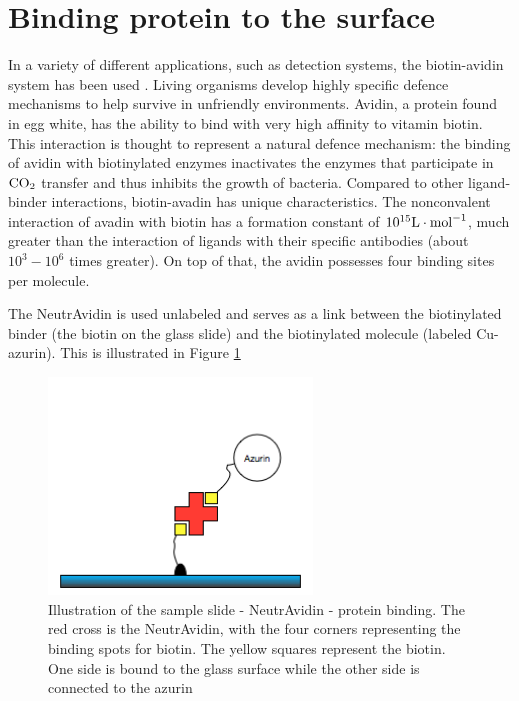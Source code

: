 \documentclass[twoside,single]{lion-msc}
\begin{document}
\section{Binding protein to the surface}\label{neutra}
In a variety of different applications, such as detection systems, the biotin-avidin system has been used \cite{Diamandis1991}. Living organisms develop highly specific defence mechanisms to help survive in unfriendly environments. Avidin, a protein found in egg white, has the ability to bind with very high affinity to vitamin biotin. This interaction is thought to represent a natural defence mechanism: the binding of avidin with biotinylated enzymes inactivates the enzymes that participate in $\textup{CO}_{2}$ transfer and thus inhibits the growth of bacteria. Compared to other  ligand-binder interactions, biotin-avadin has unique characteristics. The nonconvalent interaction of avadin with biotin has a formation constant of $10^{15}\textup{L}\cdot \textup{mol}^{-1}$, much greater than the interaction of ligands with their specific antibodies (about $10^{3}-10^{6}$ times greater). On top of that, the avidin possesses four binding sites per molecule. 

The NeutrAvidin is used unlabeled and serves as a link between the biotinylated binder (the biotin on the glass slide) and the biotinylated molecule (labeled Cu-azurin). This is illustrated in Figure \ref{avadinbinding} 

\begin{figure}[ht!]
\centering
\includegraphics[width=70mm]{avadin}
\caption{Illustration of the sample slide - NeutrAvidin - protein binding. The red cross is the NeutrAvidin, with the four corners representing the binding spots for biotin. The yellow squares represent the biotin. One side is bound to the glass surface while the other side is connected to the azurin}
\label{avadinbinding}
\end{figure}
\end{document}
